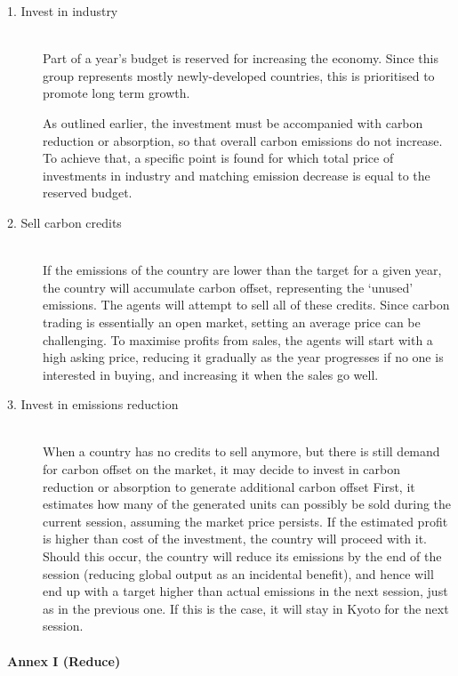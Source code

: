 \begin{description}
\item[1. Invest in industry] \hfill \\
Part of a year's budget is reserved for increasing the economy. Since this group represents mostly newly-developed countries, this is prioritised to promote long term growth.

As outlined earlier, the investment must be accompanied with carbon reduction or absorption, so that overall carbon emissions do not increase. To achieve that, a specific point is found for which total price of investments in industry and matching emission decrease is equal to the reserved budget.

\item[2. Sell carbon credits] \hfill \\
If the emissions of the country are lower than the target for a given year, the country will accumulate carbon offset, representing the `unused' emissions. The agents will attempt to sell all of these credits. Since carbon trading is essentially an open market, setting an average price can be challenging. To maximise profits from sales, the agents will start with a high asking price, reducing it gradually as the year progresses if no one is interested in buying, and increasing it when the sales go well.

\item[3. Invest in emissions reduction] \hfill \\
When a country has no credits to sell anymore, but there is still demand for carbon offset on the market, it may decide to invest in carbon reduction or absorption to generate additional carbon offset First, it estimates how many of the generated units can possibly be sold during the current session, assuming the market price persists. If the estimated profit is higher than cost of the investment, the country will proceed with it. Should this occur, the country will reduce its emissions by the end of the session (reducing global output as an incidental benefit), and hence will end up with a target higher than actual emissions in the next session, just as in the previous one. If this is the case, it will stay in Kyoto for the next session.
\end{description}

\paragraph{Annex I (Reduce)}


